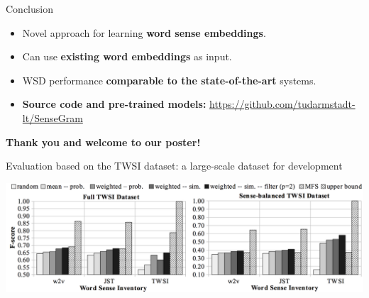 \documentclass[accentcolor=tud9c,colorbacktitle,inverttitle,landscape,german,presentation]{tudbeamer}
\begin{document}
\begin{frame}{Conclusion}
	\vfill
	\begin{itemize}
		\setlength{\itemsep}{1cm}
		\item Novel approach for learning \textbf{word sense embeddings}.
		\item Can use \textbf{existing word embeddings} as input.
		\item WSD performance \textbf{comparable to the state-of-the-art} systems.
		\item \alert{\textbf{Source code and pre-trained models:}} \url{https://github.com/tudarmstadt-lt/SenseGram}
		
	\end{itemize}
	\vfill
\end{frame}


\begin{frame}{}
	\vfill
	\begin{center}
		\alert{\textbf{\LARGE Thank you and welcome to our poster!}}
	\end{center}
	\vfill
\end{frame}


\begin{frame}{Evaluation based on the TWSI dataset: a large-scale dataset for development}
	\begin{center}
			\vspace{1.2cm}

		\includegraphics[width=1.0\textwidth]{results-plot}
	\end{center}
\end{frame}
\end{document}
